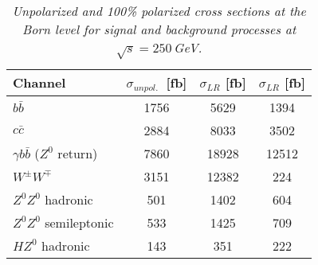         \begin{table}[H]
        \begin{center}
        \begin{tabular}{l c c c}
        \hline
	Channel & $\sigma_{unpol.}$\ [fb] & $\sigma_{LR}$ [fb] &  $\sigma_{LR}$ [fb] \\
	\hline
	$b\bar{b}$ & 1756 & 5629 & 1394 \\
	$c\bar{c}$ & 2884 & 8033 & 3502 \\
	$\gamma b\bar{b}$ ($Z^0$ return) & 7860 & 18928 & 12512 \\
	$W^\pm W^\mp $ &3151&12382&224 \\ 
	$Z^0Z^0$ hadronic &501 & 1402 & 604 \\
	$Z^0Z^0$ semileptonic  &533 & 1425 & 709\\
	$HZ^0$ hadronic  &143 & 351 & 222 \\
        \hline
        \end{tabular}
        \end{center}
        \caption{\sl Unpolarized and 100\% polarized cross sections at the Born level for signal and background processes at $\sqrt{s}=250$\,GeV. }
        \label{table:ttbarsigma}
        \end{table}
